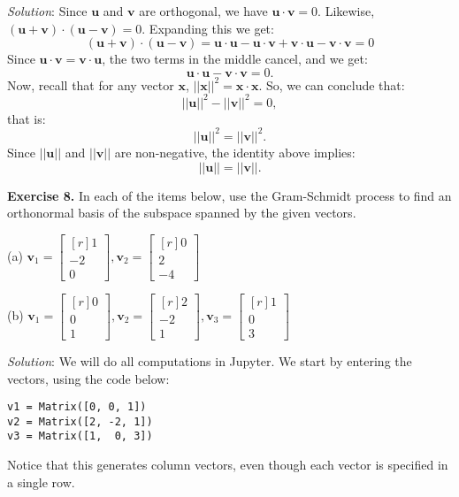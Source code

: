 \documentclass[12pt]{article}
\begin{document}
\emph{Solution}: Since $\mathbf{u}$ and $\mathbf{v}$ are orthogonal, we have $\mathbf{u}\cdot\mathbf{v}=0$. Likewise, $(\mathbf{u}+\mathbf{v})\cdot(\mathbf{u}-\mathbf{v})=0$. Expanding this we get:
\[
(\mathbf{u}+\mathbf{v})\cdot(\mathbf{u}-\mathbf{v})=
\mathbf{u}\cdot\mathbf{u}-\mathbf{u}\cdot\mathbf{v}+\mathbf{v}\cdot\mathbf{u}-\mathbf{v}\cdot\mathbf{v}=0
\]
Since $\mathbf{u}\cdot\mathbf{v}=\mathbf{v}\cdot\mathbf{u}$, the two terms in the middle cancel, and we get:
$$
\mathbf{u}\cdot\mathbf{u}-\mathbf{v}\cdot\mathbf{v}=0.
$$
Now, recall that for any vector $\mathbf{x}$, $||\mathbf{x}||^2=\mathbf{x}\cdot\mathbf{x}$. So, we can conclude that:
\[
||\mathbf{u}||^2-||\mathbf{v}||^2=0,
\]
that is:
\[
||\mathbf{u}||^2=||\mathbf{v}||^2.
\]
Since $||\mathbf{u}||$ and $||\mathbf{v}||$ are non-negative, the identity above implies:
\[
||\mathbf{u}||=||\mathbf{v}||.
\]
\proofend

\bigskip
\textbf{Exercise 8.} In each of the items below, use the Gram-Schmidt process to find an orthonormal basis of the subspace spanned by the given vectors.

\medskip
(a)
$
\mathbf{v}_1=\begin{bmatrix*}[r]1\\-2\\0\end{bmatrix*}, 
\mathbf{v}_2=\begin{bmatrix*}[r]0\\2\\-4\end{bmatrix*} 
$

\medskip
(b)
$
\mathbf{v}_1=\begin{bmatrix*}[r]0\\0\\1\end{bmatrix*}, 
\mathbf{v}_2=\begin{bmatrix*}[r]2\\-2\\1\end{bmatrix*}, 
\mathbf{v}_3=\begin{bmatrix*}[r]1\\0\\3\end{bmatrix*}
$

\emph{Solution}:
We will do all computations in Jupyter. We start by entering the vectors, using the code below:
\begin{lstlisting}
v1 = Matrix([0, 0, 1])
v2 = Matrix([2, -2, 1])
v3 = Matrix([1,  0, 3])
\end{lstlisting}
Notice that this generates column vectors, even though each vector is specified in a single row.
\end{document}
